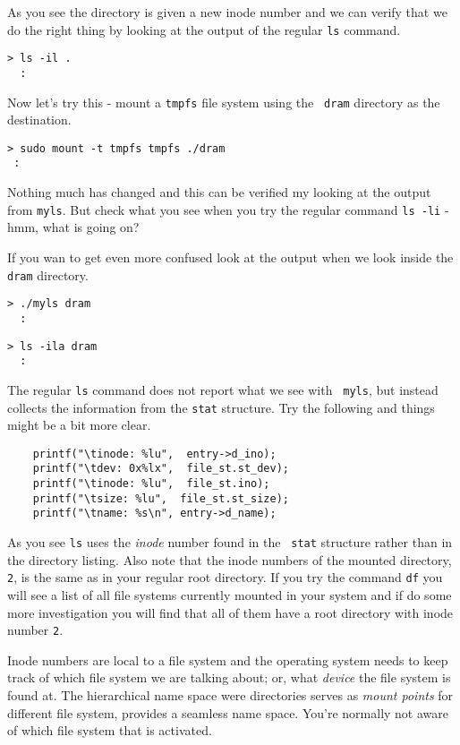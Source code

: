 \documentclass[a4paper,11pt]{article}
\begin{document}
As you see the directory is given a new inode number and we can verify
that we do the right thing by looking at the output of the regular
{\tt ls} command.

\begin{verbatim}
> ls -il .
  :
\end{verbatim}

Now let's try this - mount a {\tt tmpfs} file system using the {\tt
  dram} directory as the destination.

\begin{verbatim}
> sudo mount -t tmpfs tmpfs ./dram
 :
\end{verbatim}

Nothing much has changed and this can be verified my looking at the
output from {\tt myls}. But check what you see when you try the
regular command {\tt ls -li} - hmm, what is going on?

If you wan to get even more confused look at the output when we look
inside the {\tt dram} directory.

\begin{verbatim}
> ./myls dram
  :
\end{verbatim}

\begin{verbatim}
> ls -ila dram
  :
\end{verbatim}

The regular {\tt ls} command does not report what we see with {\tt
  myls}, but instead collects the information from the {\tt stat}
structure. Try the following and things might be a bit more clear.


\begin{lstlisting}
    printf("\tinode: %lu",  entry->d_ino);
    printf("\tdev: 0x%lx",  file_st.st_dev);  
    printf("\tinode: %lu",  file_st.ino);
    printf("\tsize: %lu",  file_st.st_size);
    printf("\tname: %s\n", entry->d_name);
 \end{lstlisting}

 As you see {\tt ls} uses the {\em inode} number found in the {\tt
   stat} structure rather than in the directory listing. Also note that
 the inode numbers of the mounted directory, {\tt 2}, is the same as in
 your regular root directory. If you try the command {\tt df} you will
 see a list of all file systems currently mounted in your system and if
 do some more investigation you will find that all of them have a root
 directory with inode number {\tt 2}. 

 Inode numbers are local to a file system and the operating system
 needs to keep track of which file system we are talking about; or,
 what {\em device} the file system is found at. The hierarchical name
 space were directories serves as {\em mount points} for different
 file system, provides a seamless name space. You're normally not
 aware of which file system that is activated.
\end{document}
